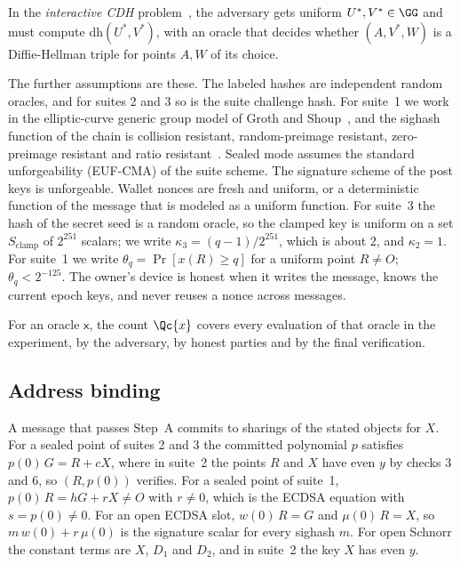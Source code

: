 \begin{definition}[ICDH]
In the \emph{interactive CDH} problem~\cite[p.~29]{GS22}, the adversary gets uniform $U^*, V^* \in \GG$ and must compute $\mathrm{dh}(U^*, V^*)$, with an oracle that decides whether $(A, V^*, W)$ is a Diffie-Hellman triple for points $A, W$ of its choice.
\end{definition}

The further assumptions are these. The labeled hashes are independent random oracles, and for suites 2 and 3 so is the suite challenge hash. For suite~1 we work in the elliptic-curve generic group model of Groth and Shoup~\cite[Section~2]{GS21}, and the sighash function of the chain is collision resistant, random-preimage resistant, zero-preimage resistant and ratio resistant~\cite[Definitions 3, 4, 5, 7]{GS21}. Sealed mode assumes the standard unforgeability (EUF-CMA) of the suite scheme. The signature scheme of the post keys is unforgeable. Wallet nonces are fresh and uniform, or a deterministic function of the message that is modeled as a uniform function. For suite~3 the hash of the secret seed is a random oracle, so the clamped key is uniform on a set $S_{\mathrm{clamp}}$ of $2^{251}$ scalars; we write $\kappa_3 = (q-1)/2^{251}$, which is about $2$, and $\kappa_2 = 1$. For suite~1 we write $\theta_q = \Pr[x(R) \ge q]$ for a uniform point $R \neq O$; $\theta_q < 2^{-125}$. The owner's device is honest when it writes the message, knows the current epoch keys, and never reuses a nonce across messages.

For an oracle $\mathsf{x}$, the count $\Qc{x}$ covers every evaluation of that oracle in the experiment, by the adversary, by honest parties and by the final verification.

\subsection{Address binding}

\begin{proposition}\label{prop:binding}
A message that passes Step~A commits to sharings of the stated objects for $X$. For a sealed point of suites 2 and 3 the committed polynomial $p$ satisfies $p(0)\,G = R + cX$, where in suite~2 the points $R$ and $X$ have even $y$ by checks 3 and 6, so $(R, p(0))$ verifies. For a sealed point of suite~1, $p(0)\,R = hG + rX \neq O$ with $r \neq 0$, which is the ECDSA equation with $s = p(0) \neq 0$. For an open ECDSA slot, $w(0)\,R = G$ and $\mu(0)\,R = X$, so $m\,w(0) + r\,\mu(0)$ is the signature scalar for every sighash $m$. For open Schnorr the constant terms are $X$, $D_1$ and $D_2$, and in suite~2 the key $X$ has even $y$.
\end{proposition}

